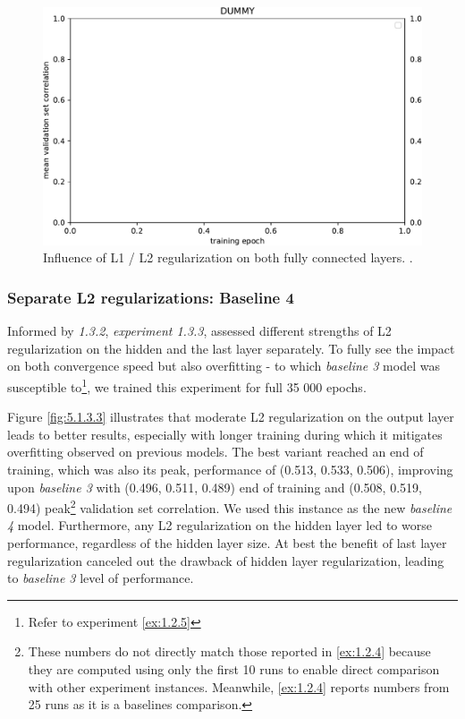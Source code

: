 \begin{figure}[H]
    \centering
    \includegraphics[width=1\textwidth]{../figures/05_dummy}
    \caption[Experiment 1.3.2]{Influence of L1 / L2 regularization on both fully connected layers.
.}
    \label{fig:5.1.3.2}
\end{figure}

\subsubsection{Separate L2 regularizations: Baseline 4}\label{ex:1.3.3}

Informed by \textit{1.3.2}, \textit{experiment 1.3.3}, assessed different strengths of L2 regularization on the hidden and the last layer separately. To fully see the impact on both convergence speed but also overfitting - to which \textit{baseline 3} model was susceptible to\footnote{Refer to experiment \ref{ex:1.2.5}}, we trained this experiment for full 35 000 epochs.

Figure \ref{fig:5.1.3.3} illustrates that moderate L2 regularization on the output layer leads to better results, especially with longer training during which it mitigates overfitting observed on previous models. The best variant reached an end of training, which was also its peak, performance of (0.513, 0.533, 0.506), improving upon \textit{baseline 3} with (0.496, 0.511, 0.489) end of training and (0.508, 0.519, 0.494) peak\footnote{These numbers do not directly match those reported in \ref{ex:1.2.4} because they are computed using only the first 10 runs to enable direct comparison with other experiment instances. Meanwhile, \ref{ex:1.2.4} reports numbers from 25 runs as it is a baselines comparison.} validation set correlation. We used this instance as the new \textit{baseline 4} model. Furthermore, any L2 regularization on the hidden layer led to worse performance, regardless of the hidden layer size. At best the benefit of last layer regularization canceled out the drawback of hidden layer regularization, leading to \textit{baseline 3} level of performance.

